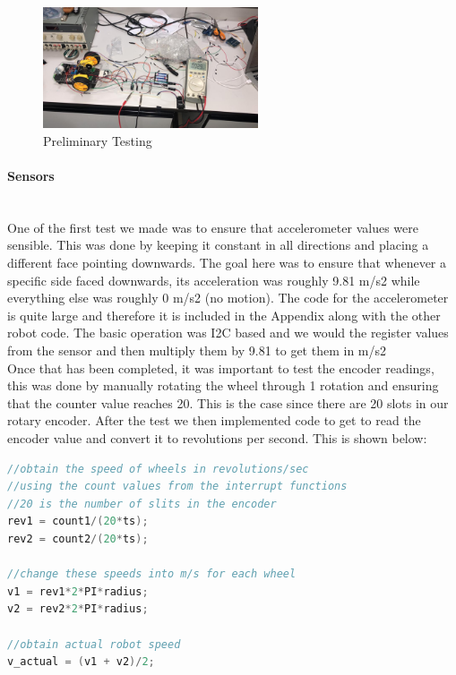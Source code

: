 \documentclass[conference]{IEEEtran}
\begin{document}
    \begin{figure}[H]
        \centering
        \captionsetup{justification=centering}
        \centering
        \includegraphics[width=2.5in]{10.png}
        \caption{Preliminary Testing}  
        \label{6}
    \end{figure}

    \paragraph{Sensors}

    ~~\\One of the first test we made was to ensure that accelerometer values were
    sensible. This was done by keeping it constant in all directions and placing
    a different face pointing downwards. The goal here was to ensure that whenever
    a specific side faced downwards, its acceleration was roughly 9.81 m/s2 while
    everything else was roughly 0 m/s2 (no motion). The code for the accelerometer is
    quite large and therefore it is included in the Appendix along with the other
    robot code. The basic operation
    was I2C based and we would the register values from the sensor and then multiply
    them by 9.81 to get them in m/s2\\

    Once that has been completed, it was important to test the encoder readings,
    this was done by manually rotating the wheel through 1 rotation and ensuring
    that the counter value reaches 20. This is the case since there are 20 slots
    in our rotary encoder. After the test we then implemented code to get to read
    the encoder value and convert it to revolutions per second. This is shown below:

\begin{lstlisting}[language=C++, caption=Encoder Code]
//obtain the speed of wheels in revolutions/sec 
//using the count values from the interrupt functions
//20 is the number of slits in the encoder 
rev1 = count1/(20*ts);
rev2 = count2/(20*ts);

//change these speeds into m/s for each wheel
v1 = rev1*2*PI*radius;
v2 = rev2*2*PI*radius;

//obtain actual robot speed
v_actual = (v1 + v2)/2;\end{lstlisting}
\end{document}
